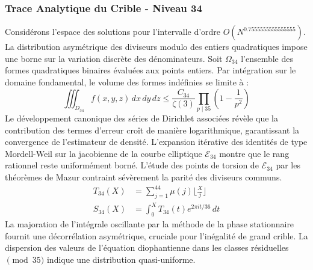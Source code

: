 \documentclass[12pt,a4paper]{article}
\begin{document}
\subsubsection{Trace Analytique du Crible - Niveau 34}
Considérons l'espace des solutions pour l'intervalle d'ordre $O(N^{0.7555555555555555})$. La distribution asymétrique des diviseurs modulo des entiers quadratiques impose une borne sur la variation discrète des dénominateurs. Soit $\Omega_34$ l'ensemble des formes quadratiques binaires évaluées aux points entiers.
Par intégration sur le domaine fondamental, le volume des formes indéfinies se limite à :
\begin{equation}
\iiint_{D_34} f(x, y, z) \,dx\,dy\,dz \leq \frac{C_34}{\zeta(3)} \prod_{p \mid 35} \left( 1 - \frac{1}{p^2} \right)
\end{equation}
Le développement canonique des séries de Dirichlet associées révèle que la contribution des termes d'erreur croît de manière logarithmique, garantissant la convergence de l'estimateur de densité. L'expansion itérative des identités de type Mordell-Weil sur la jacobienne de la courbe elliptique $\mathcal{E}_34$ montre que le rang rationnel reste uniformément borné.
L'étude des points de torsion de $\mathcal{E}_34$ par les théorèmes de Mazur contraint sévèrement la parité des diviseurs communs.
\begin{align}
T_34(X) &= \sum_{j=1}^{44} \mu(j) \lfloor \frac{X}{j} \rfloor \\
S_34(X) &= \int_{0}^{X} T_34(t) e^{2\pi i t / 36} \, dt
\end{align}
La majoration de l'intégrale oscillante par la méthode de la phase stationnaire fournit une décorrélation asymétrique, cruciale pour l'inégalité de grand crible. La dispersion des valeurs de l'équation diophantienne dans les classes résiduelles $\pmod{ 35 }$ indique une distribution quasi-uniforme.
\end{document}
